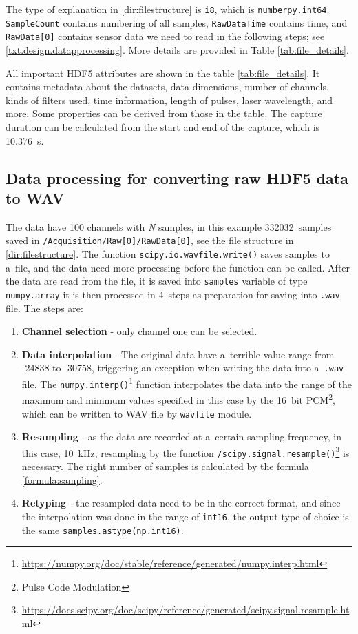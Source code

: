 The type of explanation in \ref{dir:filestructure} is \verb|i8|, which is \verb|numberpy.int64|. \verb|SampleCount| contains numbering of all samples, \verb|RawDataTime| contains time, and \verb|RawData[0]| contains sensor data we need to read in the following steps; see \ref{txt.design.datapprocessing}. More details are provided in Table \ref{tab:file_details}.

All important HDF5 attributes are shown in the table \ref{tab:file_details}. It contains metadata about the datasets, data dimensions, number of channels, kinds of filters used, time information, length of pulses, laser wavelength, and more. Some properties can be derived from those in the table. The capture duration can be calculated from the start and end of the capture, which is \qty{10,376}{\second}.

\subsection{Data processing for converting raw HDF5 data to WAV}\label{txt.implementation.processing}

The data have 100 channels with \textit{N} samples, in this example \qty{332032}{samples} saved in \verb|/Acquisition/Raw[0]/RawData[0]|, see the file structure in \ref{dir:filestructure}. The function \verb|scipy.io.wavfile.write()| saves samples to a~file, and the data need more processing before the function can be called. After the data are read from the file, it is saved into \verb|samples| variable of type \verb|numpy.array| it is then processed in 4~steps as preparation for saving into \verb|.wav| file. The steps are:

\begin{enumerate}
    \item \textbf{Channel selection} - only channel one can be selected.
    \item \textbf{Data interpolation} - The original data have a~terrible value range from -24838 to -30758, triggering an exception when writing the data into a~\verb|.wav| file. The \verb|numpy.interp()|\footnote{\url{https://numpy.org/doc/stable/reference/generated/numpy.interp.html}} function interpolates the data into the range of the maximum and minimum values specified in this case by the \qty{16}{bit} PCM\footnote{Pulse Code Modulation}, which can be written to WAV file by \verb|wavfile| module.
    \item \textbf{Resampling} - as the data are recorded at a~certain sampling frequency, in this case, \qty{10}{\kHz}, resampling by the function \texttt{/scipy.signal.resample()}\footnote{\url{https://docs.scipy.org/doc/scipy/reference/generated/scipy.signal.resample.html}} is necessary. The right number of samples is calculated by the formula \ref{formula:sampling}.
    \item \textbf{Retyping} - the resampled data need to be in the correct format, and since the interpolation was done in the range of \verb|int16|, the output type of choice is the same \verb|samples.astype(np.int16)|.
\end{enumerate}

